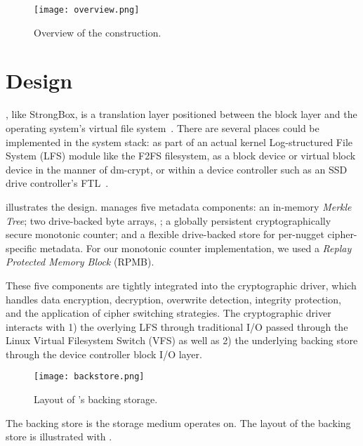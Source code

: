 \begin{figure}[t]
 \centering
  \texttt{[image: overview.png]}
   \caption{Overview of the \SYSTEM{} construction.}\label{fig:overview}
\end{figure}

\section{\SYSTEM{} Design}\label{sec:design}


\SYSTEM{}, like StrongBox, is a translation layer positioned between the block
layer and the operating system's virtual file system~\cite{StrongBox}. There are
several places \SYSTEM{} could be implemented in the system stack: as part of an
actual kernel Log-structured File System (LFS) module like the F2FS filesystem,
as a block device or virtual block device in the manner of dm-crypt, or within a
device controller such as an SSD drive controller's FTL~\cite{StrongBox}.

 illustrates the \SYSTEM{} design. \SYSTEM{} manages five
metadata components: an in-memory \emph{Merkle Tree}; two drive-backed byte
arrays, ; a
globally persistent cryptographically secure monotonic counter; and a flexible
drive-backed store for per-nugget cipher-specific metadata. For our
monotonic counter implementation, we used a \emph{Replay Protected Memory Block}
(RPMB).

These five components are tightly integrated into the cryptographic driver,
which handles data encryption, decryption, overwrite detection, integrity
protection, and the application of cipher switching strategies. The
cryptographic driver interacts with 1) the overlying LFS through traditional I/O
passed through the Linux Virtual Filesystem Switch (VFS) as well as 2) the
underlying backing store through the device controller block I/O layer.

\begin{figure}[t]
 \centering
  \texttt{[image: backstore.png]}
   \caption{Layout of \SYSTEM{}'s backing storage.}\label{fig:backstore}
\end{figure}

The backing store is the storage medium \SYSTEM{} operates on. The layout of the
backing store is illustrated with . 

